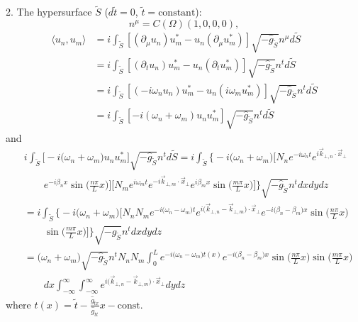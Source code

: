 \documentclass[english]{article}
\begin{document}
2. The hypersurface $\tilde{S}$ ($d\tilde{t}=0$, $\tilde{t}=\text{constant}$):
\[
n^{\mu}=C\left(\Omega\right)\left(1,0,0,0\right),
\]
 {}
\begin{align*}
\langle u_{n},u_{m}\rangle & =i\int_{\tilde{S}}\left[\left(\partial_{\mu}u_{n}\right)u^{*}_{m}-u_{n}\left(\partial_{\mu}u^{*}_{m}\right)\right]\sqrt{-\hat{g}_{\tilde{S}}}n^{\mu}d\tilde{S}\\
 & =i\int_{\tilde{S}}\left[\left(\partial_{t}u_{n}\right)u^{*}_{m}-u_{n}\left(\partial_{t}u^{*}_{m}\right)\right]\sqrt{-\hat{g}_{\tilde{S}}}n^{t}d\tilde{S}\\
 & =i\int_{\tilde{S}}\left[\left(-i\omega_{n}u_{n}\right)u^{*}_{m}-u_{n}\left(i\omega_{m}u^{*}_{m}\right)\right]\sqrt{-\hat{g}_{\tilde{S}}}n^{t}d\tilde{S}\\
 & =i\int_{\tilde{S}}\left[-i\left(\omega_{n}+\omega_{m}\right)u_{n}u^{*}_{m}\right]\sqrt{-\hat{g}_{\tilde{S}}}n^{t}d\tilde{S}
\end{align*}
 and 
\begin{align*}
 & i\int_{\tilde{S}}\biggl[-i\biggl(\omega_{n}+\omega_{m}\biggr)u_{n}u^{*}_{m}\biggr]\sqrt{-\hat{g}_{\tilde{S}}}n^{t}d\tilde{S}=i\int_{\tilde{S}}\biggl\{-i\biggl(\omega_{n}+\omega_{m}\biggr)\biggl[N_{n}e^{-i\omega_{n}t}e^{i\vec{k}_{\bot,n}\cdot\vec{x}_{\bot}}\\
 & \qquad e^{-i\beta_{n}x}\sin\biggl(\frac{n\pi}{L}x\biggr)\biggr]\biggl[N_{m}e^{i\omega_{m}t}e^{-i\vec{k}_{\bot,m}\cdot\vec{x}_{\bot}}e^{i\beta_{m}x}\sin\biggl(\frac{m\pi}{L}x\biggr)\biggr]\biggr\}\sqrt{-\hat{g}_{\tilde{S}}}n^{t}dxdydz\\
 & =i\int_{\tilde{S}}\biggl\{-i\biggl(\omega_{n}+\omega_{m}\biggr)\biggl[N_{n}N_{m}e^{-i\biggl(\omega_{n}-\omega_{m}\biggr)t}e^{i\biggl(\vec{k}_{\bot,n}-\vec{k}_{\bot,m}\biggr)\cdot\vec{x}_{\bot}}e^{-i\biggl(\beta_{n}-\beta_{m}\biggr)x}\sin\biggl(\frac{n\pi}{L}x\biggr)\\
 & \qquad\sin\biggl(\frac{m\pi}{L}x\biggr)\biggr]\biggr\}\sqrt{-\hat{g}_{\tilde{S}}}n^{t}dxdydz\\
 & =\biggl(\omega_{n}+\omega_{m}\biggr)\sqrt{-\hat{g}_{\tilde{S}}}n^{t}N_{n}N_{m}\int^{L}_{0}e^{-i\biggl(\omega_{n}-\omega_{m}\biggr)t(x)}e^{-i\biggl(\beta_{n}-\beta_{m}\biggr)x}\sin\biggl(\frac{n\pi}{L}x\biggr)\sin\biggl(\frac{m\pi}{L}x\biggr)\\
 & \qquad dx\int^{\infty}_{-\infty}\int^{\infty}_{-\infty}e^{i\biggl(\vec{k}_{\bot,n}-\vec{k}_{\bot,m}\biggr)\cdot\vec{x}_{\bot}}dydz
\end{align*}
 where $t(x)=\tilde{t}-\frac{\hat{g}_{tx}}{\hat{g}_{tt}}x-\text{const}$.
\end{document}
